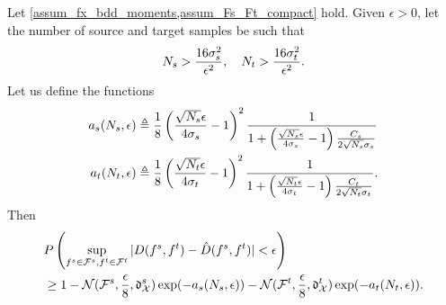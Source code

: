 \documentclass[review,supplement,onefignum,onetabnum]{siamonline250211}
\begin{document}
    
\begin{lemma}
\label{lem:unif_bnd_D_hD}

Let \cref{assum_fx_bdd_moments,assum_Fs_Ft_compact} hold. Given $\epsilon>0$, let the number of source and target samples be such that
%
\begin{equation*}
N_s > \frac{16 \sigma_s^2}{\epsilon^2},
\quad
N_t > \frac{16 \sigma_t^2}{\epsilon^2}.
\end{equation*}
%
Let us define the functions
%
\begin{equation*}
\begin{split}
a_s(N_s, \epsilon) &\triangleq 
    \frac{1}{8}\left( \frac{\sqrt{N_s} \epsilon}{4 \sigma_s} -1\right)^2 \frac{1}{1+\left( \frac{\sqrt{N_s} \epsilon}{4 \sigma_s} -1 \right)\frac{C_s}{2 \sqrt{N_s} \sigma_s }}
    \\
a_t(N_t, \epsilon) &\triangleq  
    \frac{1}{8}\left( \frac{\sqrt{N_t} \epsilon}{4 \sigma_t} -1\right)^2 \frac{1}{1+\left( \frac{\sqrt{N_t} \epsilon} 
    {4 \sigma_t} -1 \right)\frac{C_t}{2 \sqrt{N_t} \sigma_t }}.
\end{split}
\end{equation*}
%
Then 
%
\begin{equation*}
\begin{split}
& P \left(
\sup_{f^s \in \mathcal{F}^s, f^t \in \mathcal{F}^t}  | D(f^s, f^t) - \hat{D} (f^s, f^t)  | < \epsilon
\right) \\
& \geq 1 - \mathcal{N}(\mathcal{F}^s, \frac{\epsilon}{8}, \mathfrak{d}^s_{\mathcal{X}} ) \exp(-a_s(N_s, \epsilon)) 
- \mathcal{N}(\mathcal{F}^t, \frac{\epsilon}{8}, \mathfrak{d}^t_{\mathcal{X}} ) \exp(-a_t(N_t, \epsilon)).
\end{split}
\end{equation*}
%
%
\end{lemma}
\end{document}
